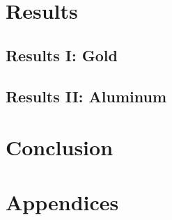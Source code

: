 \documentclass[a4paper]{article}
\begin{document}
\qq

\qq 

\qq 

\qq 

\qq 

\section{Results}

\subsection{Results I: Gold}

\qq 

\qq 

\qq

\subsection{Results II: Aluminum}

\qq 

\qq 

\qq

\section{Conclusion}

\qq 

\qq 

\section{Appendices}
\end{document}
